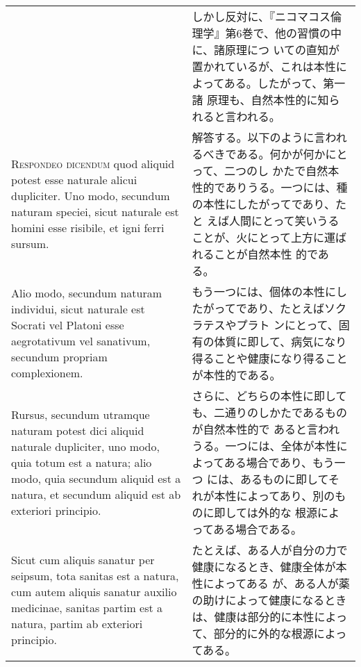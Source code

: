 \documentclass[10pt]{jsarticle} %
\begin{document}
\begin{longtable}{p{21em}p{21em}}
&

しかし反対に、『ニコマコス倫理学』第6巻で、他の習慣の中に、諸原理につ
いての直知が置かれているが、これは本性によってある。したがって、第一諸
原理も、自然本性的に知られると言われる。

\\


{\scshape Respondeo dicendum} quod aliquid potest esse naturale alicui
dupliciter. Uno modo, secundum naturam speciei, sicut naturale est
homini esse risibile, et igni ferri sursum.


&

解答する。以下のように言われるべきである。何かが何かにとって、二つのし
かたで自然本性的でありうる。一つには、種の本性にしたがってであり、たと
えば人間にとって笑いうることが、火にとって上方に運ばれることが自然本性
的である。

\\



Alio modo, secundum naturam individui, sicut naturale est Socrati vel
Platoni esse aegrotativum vel sanativum, secundum propriam
complexionem.


&

もう一つには、個体の本性にしたがってであり、たとえばソクラテスやプラト
ンにとって、固有の体質に即して、病気になり得ることや健康になり得ること
が本性的である。

\\



Rursus, secundum utramque naturam potest dici aliquid naturale
dupliciter, uno modo, quia totum est a natura; alio modo, quia
secundum aliquid est a natura, et secundum aliquid est ab exteriori
principio.


&

さらに、どちらの本性に即しても、二通りのしかたであるものが自然本性的で
あると言われうる。一つには、全体が本性によってある場合であり、もう一つ
には、あるものに即してそれが本性によってあり、別のものに即しては外的な
根源によってある場合である。

\\



Sicut cum aliquis sanatur per seipsum, tota sanitas est a natura, cum
autem aliquis sanatur auxilio medicinae, sanitas partim est a natura,
partim ab exteriori principio.


&

たとえば、ある人が自分の力で健康になるとき、健康全体が本性によってある
が、ある人が薬の助けによって健康になるときは、健康は部分的に本性によっ
て、部分的に外的な根源によってある。


\end{longtable}
\end{document}
